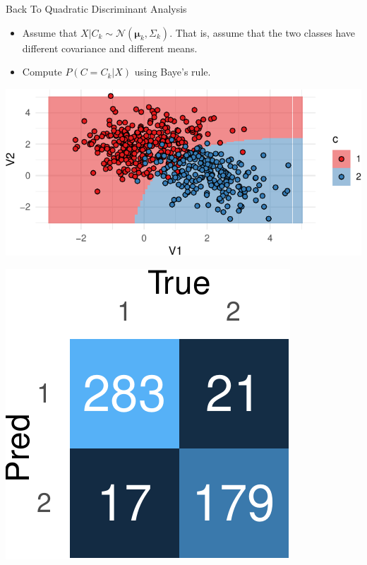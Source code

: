 \documentclass[12pt,ignorenonframetext,]{beamer}
\begin{document}
\begin{frame}{Back To Quadratic Discriminant Analysis}
\protect\hypertarget{back-to-quadratic-discriminant-analysis}{}

\begin{itemize}
\item
  Assume that
  \(X | C_k \sim \mathcal{N}(\boldsymbol{\mu}_k, \Sigma_k)\). That is,
  assume that the two classes have different covariance and different
  means.
\item
  Compute \(P(C = C_k | X)\) using Baye's rule.
\end{itemize}

\end{frame}

\begin{frame}{}
\protect\hypertarget{section-2}{}

\begin{center}\includegraphics{CSS_Presentation_files/figure-beamer/unnamed-chunk-5-1} \end{center}

\end{frame}

\begin{frame}{}
\protect\hypertarget{section-3}{}

\begin{center}\includegraphics{CSS_Presentation_files/figure-beamer/unnamed-chunk-6-1} \end{center}

\end{frame}
\end{document}

